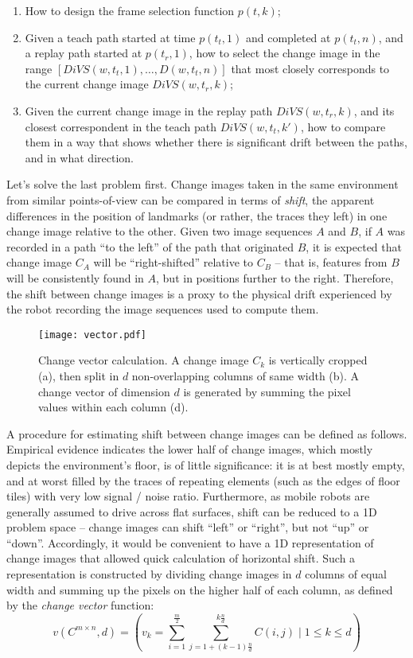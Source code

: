 \documentclass[twocolumn, 9pt,fleqn]{jsproceedings}
\begin{document}
\begin{enumerate}
\item How to design the frame selection function $p(t, k)$;
\item Given a teach path started at time $p(t_t, 1)$ and completed at $p(t_t, n)$, and a replay path started at $p(t_r, 1)$, how to select the change image in the range $[DiVS(w, t_t, 1), \dotsc, D(w, t_t, n)]$ that most closely corresponds to the current change image $DiVS(w, t_r, k)$;
\item Given the current change image in the replay path $DiVS(w, t_r, k)$, and its closest correspondent in the teach path $DiVS(w, t_t, k')$, how to compare them in a way that shows whether there is significant drift between the paths, and in what direction.
\end{enumerate}

Let's solve the last problem first. Change images taken in the same environment from similar points-of-view can be compared in terms of \textit{shift}, the apparent differences in the position of landmarks (or rather, the traces they left) in one change image relative to the other. Given two image sequences $A$ and $B$, if $A$ was recorded in a path ``to the left'' of the path that originated $B$, it is expected that change image $C_A$ will be ``right-shifted'' relative to $C_B$ -- that is, features from $B$ will be consistently found in $A$, but in positions further to the right. Therefore, the shift between change images is a proxy to the physical drift experienced by the robot recording the image sequences used to compute them.

\begin{figure}[h!]
\texttt{[image: vector.pdf]}
\caption{Change vector calculation. A change image $C_k$ is vertically cropped (a), then split in $d$ non-overlapping columns of same width (b). A change vector of dimension $d$ is generated by summing the pixel values within each column (d).}
\label{fig:vector}
\end{figure}

A procedure for estimating shift between change images can be defined as follows. Empirical evidence indicates the lower half of change images, which mostly depicts the environment's floor, is of little significance: it is at best mostly empty, and at worst filled by the traces of repeating elements (such as the edges of floor tiles) with very low signal / noise ratio. Furthermore, as mobile robots are generally assumed to drive across flat surfaces, shift can be reduced to a 1D problem space -- change images can shift ``left'' or ``right'', but not ``up'' or ``down''. Accordingly, it would be convenient to have a 1D representation of change images that allowed quick calculation of horizontal shift. Such a representation is constructed by dividing change images in $d$ columns of equal width and summing up the pixels on the higher half of each column, as defined by the \textit{change vector} function:
\begin{equation}
v(C^{m \times n}, d) = (v_k = \sum_{i=1}^{\frac{m}{2}} {\sum_{j=1 + (k - 1)\frac{n}{d}}^{k\frac{n}{d}}{C(i, j)}} \; | \; 1 \leq k \leq d)
\end{equation}
\end{document}
